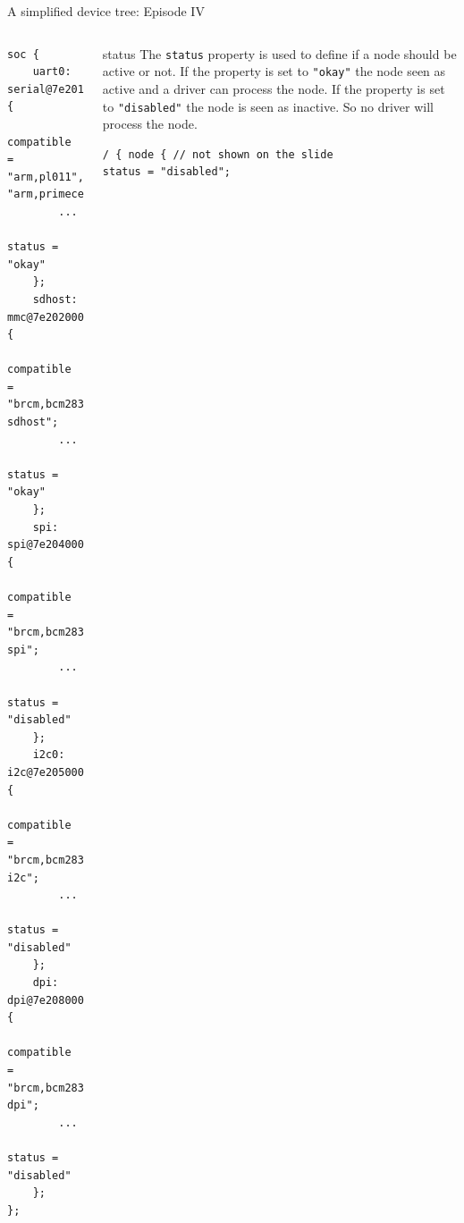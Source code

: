 \documentclass[aspectratio=169]{beamer}
\newcommand{\sectiontitle}{}
\begin{document}
\begin{frame}[fragile]{A simplified device tree: Episode IV}{\sectiontitle}
\begin{columns}[T]
\begin{verbatim}
soc {
	uart0: serial@7e201000 {
		compatible = "arm,pl011", "arm,primecell";
		...
		status = "okay"
	};
	sdhost: mmc@7e202000 {
		compatible = "brcm,bcm2835-sdhost";
		...
		status = "okay"
	};
	spi: spi@7e204000 {
		compatible = "brcm,bcm2835-spi";
		...
		status = "disabled"
	};
	i2c0: i2c@7e205000 {
		compatible = "brcm,bcm2835-i2c";
		...
		status = "disabled"
	};
	dpi: dpi@7e208000 {
		compatible = "brcm,bcm2835-dpi";
		...
		status = "disabled"
	};
};
\end{verbatim}
\begin{block}{status}
The \verb|status| property is used to define if a node should be active or not.
If the property is set to \verb|"okay"| the node seen as active and a driver
can process the node. If the property is set to \verb|"disabled"| the node is
seen as inactive. So no driver will process the node.
\begin{verbatim}
/ { node { // not shown on the slide
status = "disabled";
\end{verbatim}
\end{block}
\end{columns}
\end{frame}
\end{document}
